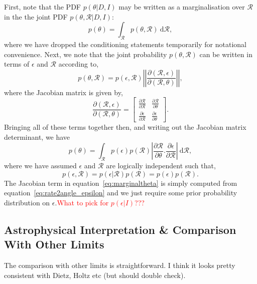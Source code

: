 \documentclass[twocolumn,nofootinbib]{revtex4}
\newcommand{\cbcrate}{{{\mathcal R}}}
\newcommand{\diff}{{\mathrm d}}
\begin{document}
First, note that the PDF $p(\theta|D,I)$ may be written as a marginalisation
over $\cbcrate$ in the the joint PDF $p(\theta, \cbcrate|D,I)$:
%
\begin{equation}
p(\theta) = \int_{\cbcrate} p(\theta,\cbcrate)~\diff \cbcrate,
\end{equation}
%
where we have dropped the conditioning statements temporarily for notational
convenience.  Next, we note that the joint probability $p(\theta,\cbcrate)$ can
be written in terms of $\epsilon$ and $\cbcrate$ according to,
%
\begin{equation}
p(\theta,\cbcrate) = p(\epsilon,\cbcrate)
\left\lvert\left\lvert
\frac{\partial(\cbcrate,\epsilon)}{\partial(\cbcrate,\theta)}
\right\rvert\right\rvert,
\end{equation}
%
where the Jacobian matrix is given by,
%
\begin{equation}
\frac{\partial (\cbcrate,\epsilon)}{\partial(\cbcrate,\theta)} =
\begin{bmatrix}
\frac{\partial \cbcrate}{\partial \cbcrate} & \frac{\partial \cbcrate}{\partial \theta} \\
\frac{\partial \epsilon}{\partial \cbcrate} & \frac{\partial \epsilon}{\partial \theta}
\end{bmatrix}.
\end{equation}
%
Bringing all of these terms together then, and writing out the Jacobian matrix
determinant, we have
%
\begin{equation}\label{eq:marginaltheta}
p(\theta) = \int_{\cbcrate} p(\epsilon)p(\cbcrate) \left\lvert
\frac{\partial\cbcrate}{\partial\theta}.\frac{\partial\epsilon}{\partial\cbcrate}\right\rvert~\diff
\cbcrate,
\end{equation}
%
where we have assumed $\epsilon$ and $\cbcrate$ are logically independent such
that,
\begin{equation}
p(\epsilon,\cbcrate) = p(\epsilon|\cbcrate)p(\cbcrate) = p(\epsilon)p(\cbcrate).
\end{equation}
%
The Jacobian term in equation~\ref{eq:marginaltheta} is simply computed from
equation~\ref{eq:rate2angle_epsilon} and we just require some prior probability
distribution on $\epsilon$.\textcolor{red}{What to pick for $p(\epsilon|I)$???}

\subsection{Astrophysical Interpretation \& Comparison With Other Limits}
The comparison with other limits is straightforward.  I think it looks pretty
consistent with Dietz, Holtz etc (but should double check).
\end{document}
